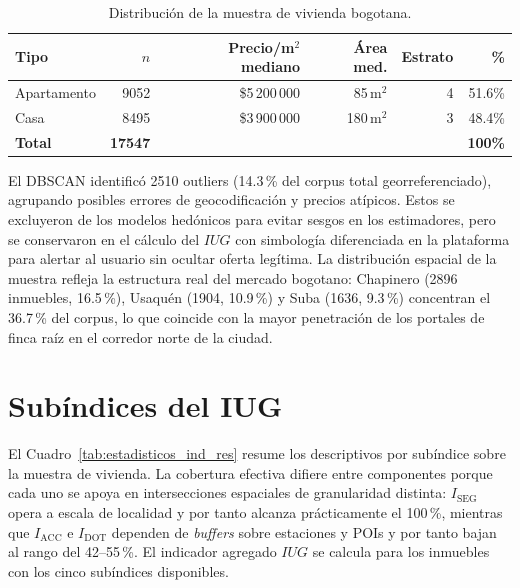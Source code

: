 \documentclass[12pt, a4paper, twoside, openright]{report}
\theoremstyle{plain}
\theoremstyle{definition}
\newcommand{\IACC}{I_{\text{ACC}}} %
\newcommand{\ISEG}{I_{\text{SEG}}} %
\newcommand{\IDOT}{I_{\text{DOT}}} %
\newcommand{\IUG}{IUG}             %
\begin{document}
\begin{table}[htbp]
\centering
\caption{Distribución de la muestra de vivienda bogotana.}
\label{tab:distribucion_res}
\begin{tabular}{@{}lrrrrr@{}}
\toprule
\textbf{Tipo} & $n$ & \textbf{Precio/m$^2$ mediano} & \textbf{Área med.} &
\textbf{Estrato} & \textbf{\%} \\
\midrule
Apartamento & \num{9052} & \$5\,200\,000 &  85\,m$^2$ & 4 & 51.6\% \\
Casa        & \num{8495} & \$3\,900\,000 & 180\,m$^2$ & 3 & 48.4\% \\
\midrule
\textbf{Total} & \textbf{\num{17547}} & & & & \textbf{100\%} \\
\bottomrule
\end{tabular}
\end{table}

El DBSCAN identificó \num{2510} outliers (14.3\,\% del corpus total georreferenciado), agrupando posibles errores de geocodificación y precios atípicos. Estos se excluyeron de los modelos hedónicos para evitar sesgos en los estimadores, pero se conservaron en el cálculo del $\IUG{}$ con simbología diferenciada en la plataforma para alertar al usuario sin ocultar oferta legítima. La distribución espacial de la muestra refleja la estructura real del mercado bogotano: Chapinero (\num{2896} inmuebles, 16.5\,\%), Usaquén (\num{1904}, 10.9\,\%) y Suba (\num{1636}, 9.3\,\%) concentran el 36.7\,\% del corpus, lo que coincide con la mayor penetración de los portales de finca raíz en el corredor norte de la ciudad.


\section{Subíndices del IUG}\label{sec:subindices}

El Cuadro~\ref{tab:estadisticos_ind_res} resume los descriptivos por subíndice sobre la muestra de vivienda. La cobertura efectiva difiere entre componentes porque cada uno se apoya en intersecciones espaciales de granularidad distinta: $\ISEG$ opera a escala de localidad y por tanto alcanza prácticamente el 100\,\%, mientras que $\IACC$ e $\IDOT$ dependen de \emph{buffers} sobre estaciones y POIs y por tanto bajan al rango del 42--55\,\%. El indicador agregado $\IUG{}$ se calcula para los inmuebles con los cinco subíndices disponibles.
\end{document}
